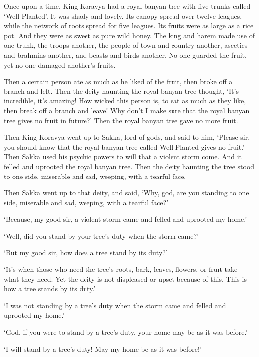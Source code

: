 \documentclass[12pt,openany]{book}%
\begin{document}
Once upon a time, King Koravya had a royal banyan tree with five trunks called ‘Well Planted’. It was shady and lovely. Its canopy spread over twelve leagues, while the network of roots spread for five leagues. Its fruits were as large as a rice pot. And they were as sweet as pure wild honey. The king and harem made use of one trunk, the troops another, the people of town and country another, ascetics and brahmins another, and beasts and birds another. No-one guarded the fruit, yet no-one damaged another’s fruits. 

Then a certain person ate as much as he liked of the fruit, then broke off a branch and left. Then the deity haunting the royal banyan tree thought, ‘It’s incredible, it’s amazing! How wicked this person is, to eat as much as they like, then break off a branch and leave! Why don’t I make sure that the royal banyan tree gives no fruit in future?’ Then the royal banyan tree gave no more fruit. 

Then King Koravya went up to Sakka, lord of gods, and said to him, ‘Please sir, you should know that the royal banyan tree called Well Planted gives no fruit.’ Then Sakka used his psychic powers to will that a violent storm come. And it felled and uprooted the royal banyan tree. Then the deity haunting the tree stood to one side, miserable and sad, weeping, with a tearful face. 

Then Sakka went up to that deity, and said, ‘Why, god, are you standing to one side, miserable and sad, weeping, with a tearful face?’ 

‘Because, my good sir, a violent storm came and felled and uprooted my home.’ 

‘Well, did you stand by your tree’s duty when the storm came?’ 

‘But my good sir, how does a tree stand by its duty?’ 

‘It’s when those who need the tree’s roots, bark, leaves, flowers, or fruit take what they need. Yet the deity is not displeased or upset because of this. This is how a tree stands by its duty.’ 

‘I was not standing by a tree’s duty when the storm came and felled and uprooted my home.’ 

‘God, if you were to stand by a tree’s duty, your home may be as it was before.’ 

‘I will stand by a tree’s duty! May my home be as it was before!’ 
\end{document}

